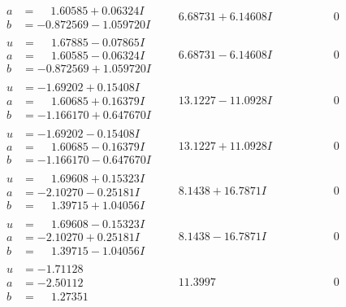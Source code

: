 \documentclass[1p]{elsarticle_modified}
\theoremstyle{definition}
\begin{document}
$$\begin{array}{c|c|c}
\begin{aligned}
a &= \phantom{-}1.60585 + 0.06324 I \\
b &= -0.872569 - 1.059720 I\end{aligned}
 & \phantom{-}6.68731 + 6.14608 I & \phantom{-0.000000 } 0 \\ \hline\begin{aligned}
u &= \phantom{-}1.67885 - 0.07865 I \\
a &= \phantom{-}1.60585 - 0.06324 I \\
b &= -0.872569 + 1.059720 I\end{aligned}
 & \phantom{-}6.68731 - 6.14608 I & \phantom{-0.000000 } 0 \\ \hline\begin{aligned}
u &= -1.69202 + 0.15408 I \\
a &= \phantom{-}1.60685 + 0.16379 I \\
b &= -1.166170 + 0.647670 I\end{aligned}
 & \phantom{-}13.1227 - 11.0928 I & \phantom{-0.000000 } 0 \\ \hline\begin{aligned}
u &= -1.69202 - 0.15408 I \\
a &= \phantom{-}1.60685 - 0.16379 I \\
b &= -1.166170 - 0.647670 I\end{aligned}
 & \phantom{-}13.1227 + 11.0928 I & \phantom{-0.000000 } 0 \\ \hline\begin{aligned}
u &= \phantom{-}1.69608 + 0.15323 I \\
a &= -2.10270 - 0.25181 I \\
b &= \phantom{-}1.39715 + 1.04056 I\end{aligned}
 & \phantom{-}8.1438 + 16.7871 I & \phantom{-0.000000 } 0 \\ \hline\begin{aligned}
u &= \phantom{-}1.69608 - 0.15323 I \\
a &= -2.10270 + 0.25181 I \\
b &= \phantom{-}1.39715 - 1.04056 I\end{aligned}
 & \phantom{-}8.1438 - 16.7871 I & \phantom{-0.000000 } 0 \\ \hline\begin{aligned}
u &= -1.71128\phantom{ +0.000000I} \\
a &= -2.50112\phantom{ +0.000000I} \\
b &= \phantom{-}1.27351\phantom{ +0.000000I}\end{aligned}
 & \phantom{-}11.3997\phantom{ +0.000000I} & \phantom{-0.000000 } 0 \\ \hline\begin{aligned}

\end{aligned}
\end{array}$$
\end{document}
